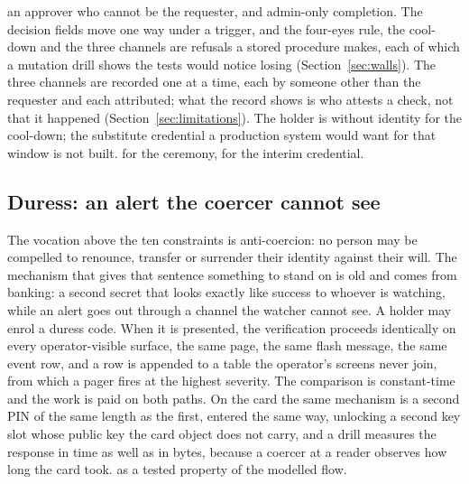\begin{description}
    an approver who cannot be the requester, and admin-only completion. The decision fields move one
    way under a trigger, and the four-eyes rule, the cool-down and the three channels are refusals a
    stored procedure makes, each of which a mutation drill shows the tests would notice losing
    (Section~\ref{sec:walls}). The three channels are recorded one at a time, each
    by someone other than the requester and each attributed; what the record shows is who attests a
    check, not that it happened (Section~\ref{sec:limitations}). The holder is without identity for the cool-down; the
    substitute credential a production system would want for that window is not built. \sImplMark{}
    for the ceremony, \sFut{} for the interim credential.
\end{description}

\subsection{Duress: an alert the coercer cannot see}

The vocation above the ten constraints is anti-coercion: no person may be compelled to renounce,
transfer or surrender their identity against their will. The mechanism that gives that sentence
something to stand on is old and comes from banking: a second secret that looks exactly like
success to whoever is watching, while an alert goes out through a channel the watcher cannot see.
A holder may enrol a duress code. When it is presented, the verification proceeds identically on
every operator-visible surface, the same page, the same flash message, the same event row, and a
 row is appended to a table the operator's screens never join, from which a
pager fires at the highest severity. The comparison is constant-time and the work is paid on both
paths. On the card the same mechanism is a second PIN of the same length as the first, entered the
same way, unlocking a second key slot whose public key the card object does not carry, and a drill
measures the response in time as well as in bytes, because a coercer at a reader observes how long
the card took. \sImplMark{} as a tested property of the modelled flow.

